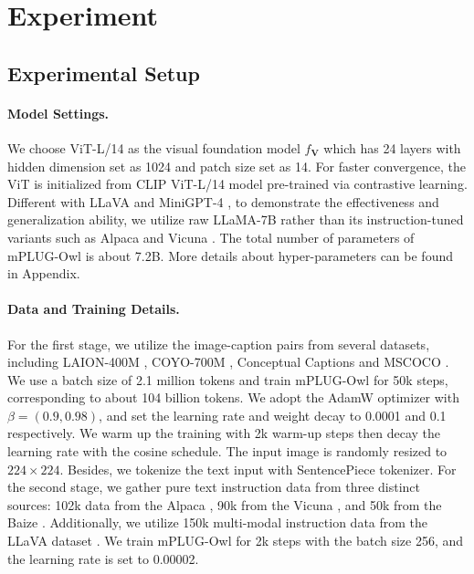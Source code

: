 \documentclass{article}
\newcommand{\modelname}{mPLUG-Owl\xspace}
\begin{document}
\section{Experiment}
\subsection{Experimental Setup}
\paragraph{Model Settings.}We choose ViT-L/14 \citep{vit} as the visual foundation model $f_{\mathbf{V}}$ which has 24 layers with hidden dimension set as 1024 and patch size set as 14. For faster convergence, the ViT is initialized from CLIP ViT-L/14 model pre-trained via contrastive learning. Different with LLaVA \citep{llava} and MiniGPT-4 \citep{minigpt4}, to demonstrate the effectiveness and generalization ability, we utilize raw LLaMA-7B \citep{llama} rather than its instruction-tuned variants such as Alpaca \citep{alpaca} and Vicuna \citep{vicuna}. The total number of parameters of \modelname is about 7.2B. More details about hyper-parameters can be found in Appendix.

\paragraph{Data and Training Details.} For the first stage, we utilize the image-caption pairs from several datasets, including LAION-400M \citep{laion400m}, COYO-700M \citep{coyo700m}, Conceptual Captions \citep{conceptualcap} and MSCOCO \citep{cococap}. We use a batch size of 2.1 million tokens and train \modelname for 50k steps, corresponding to about 104 billion tokens. We adopt the AdamW optimizer with $\beta=(0.9, 0.98)$, and set the learning rate and weight decay to 0.0001 and 0.1 respectively. We warm up the training with 2k warm-up steps then decay the learning rate with the cosine schedule. The input image is randomly resized to $224\times 224$. Besides, we tokenize the text input with SentencePiece \citep{sentencepiece} tokenizer. 
For the second stage, we gather pure text instruction data from three distinct sources: 102k data from the Alpaca \citep{alpaca}, 90k from the Vicuna \citep{vicuna}, and 50k from the Baize \citep{baize}. Additionally, we utilize 150k multi-modal instruction data from the LLaVA dataset \citep{llava}.
We train \modelname for 2k steps with the batch size 256, and the learning rate is set to 0.00002.
\end{document}
